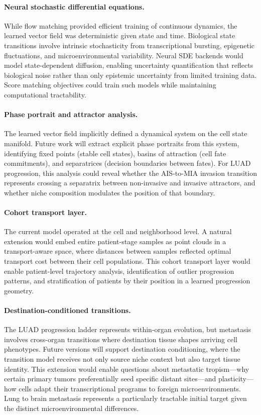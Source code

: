 \paragraph{Neural stochastic differential equations.} While flow matching provided efficient training of continuous dynamics, the learned vector field was deterministic given state and time. Biological state transitions involve intrinsic stochasticity from transcriptional bursting, epigenetic fluctuations, and microenvironmental variability. Neural SDE backends would model state-dependent diffusion, enabling uncertainty quantification that reflects biological noise rather than only epistemic uncertainty from limited training data. Score matching objectives could train such models while maintaining computational tractability.

\paragraph{Phase portrait and attractor analysis.} The learned vector field implicitly defined a dynamical system on the cell state manifold. Future work will extract explicit phase portraits from this system, identifying fixed points (stable cell states), basins of attraction (cell fate commitments), and separatrices (decision boundaries between fates). For LUAD progression, this analysis could reveal whether the AIS-to-MIA invasion transition represents crossing a separatrix between non-invasive and invasive attractors, and whether niche composition modulates the position of that boundary.

\paragraph{Cohort transport layer.} The current model operated at the cell and neighborhood level. A natural extension would embed entire patient-stage samples as point clouds in a transport-aware space, where distances between samples reflected optimal transport cost between their cell populations. This cohort transport layer would enable patient-level trajectory analysis, identification of outlier progression patterns, and stratification of patients by their position in a learned progression geometry.

\paragraph{Destination-conditioned transitions.} The LUAD progression ladder represents within-organ evolution, but metastasis involves cross-organ transitions where destination tissue shapes arriving cell phenotypes. Future versions will support destination conditioning, where the transition model receives not only source niche context but also target tissue identity. This extension would enable questions about metastatic tropism---why certain primary tumors preferentially seed specific distant sites---and plasticity---how cells adapt their transcriptional programs to foreign microenvironments. Lung to brain metastasis represents a particularly tractable initial target given the distinct microenvironmental differences.

